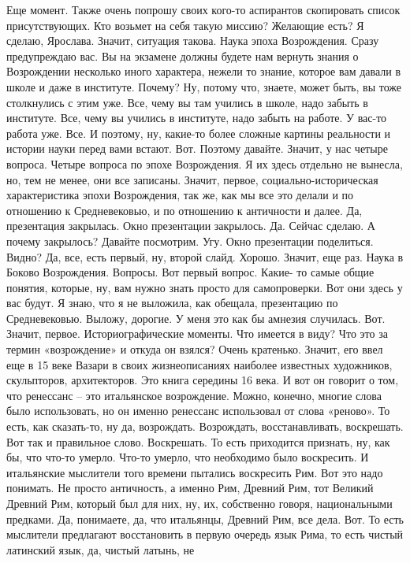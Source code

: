  Еще момент. Также очень попрошу своих кого-то аспирантов скопировать список
присутствующих. Кто возьмет на себя такую миссию? Желающие есть? Я сделаю,
Ярослава. Значит, ситуация такова. Наука эпоха Возрождения. Сразу предупреждаю
вас. Вы на экзамене должны будете нам вернуть знания о Возрождении несколько
иного характера, нежели то знание, которое вам давали в школе и даже в
институте. Почему? Ну, потому что, знаете, может быть, вы тоже столкнулись с
этим уже. Все, чему вы там учились в школе, надо забыть в институте. Все, чему
вы учились в институте, надо забыть на работе. У вас-то работа уже. Все. И
поэтому, ну, какие-то более сложные картины реальности и истории науки перед
вами встают. Вот. Поэтому давайте. Значит, у нас четыре вопроса. Четыре вопроса
по эпохе Возрождения. Я их здесь отдельно не вынесла, но, тем не менее, они все
записаны. Значит, первое, социально-историческая характеристика эпохи
Возрождения, так же, как мы все это делали и по отношению к Средневековью, и по
отношению к античности и далее. Да, презентация закрылась. Окно презентации
закрылось. Да. Сейчас сделаю. А почему закрылось? Давайте посмотрим. Угу. Окно
презентации поделиться. Видно? Да, все, есть первый, ну, второй слайд. Хорошо.
Значит, еще раз. Наука в Боково Возрождения. Вопросы. Вот первый вопрос. Какие-
то самые общие понятия, которые, ну, вам нужно знать просто для самопроверки.
Вот они здесь у вас будут. Я знаю, что я не выложила, как обещала, презентацию
по Средневековью. Выложу, дорогие. У меня это как бы амнезия случилась. Вот.
Значит, первое. Историографические моменты. Что имеется в виду? Что это за
термин «возрождение» и откуда он взялся? Очень кратенько. Значит, его ввел еще в
15 веке Вазари в своих жизнеописаниях наиболее известных художников,
скульпторов, архитекторов. Это книга середины 16 века. И вот он говорит о том,
что ренессанс – это итальянское возрождение. Можно, конечно, многие слова было
использовать, но он именно ренессанс использовал от слова «реново». То есть, как
сказать-то, ну да, возрождать. Возрождать, восстанавливать, воскрешать. Вот так
и правильное слово. Воскрешать. То есть приходится признать, ну, как бы, что
что-то умерло. Что-то умерло, что необходимо было воскресить. И итальянские
мыслители того времени пытались воскресить Рим. Вот это надо понимать. Не просто
античность, а именно Рим, Древний Рим, тот Великий Древний Рим, который был для
них, ну, их, собственно говоря, национальными предками. Да, понимаете, да, что
итальянцы, Древний Рим, все дела. Вот. То есть мыслители предлагают восстановить
в первую очередь язык Рима, то есть чистый латинский язык, да, чистый латынь, не
